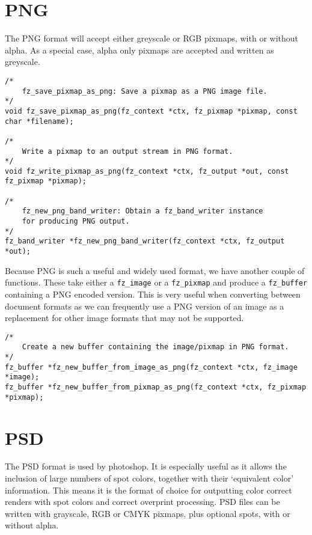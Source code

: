 \documentclass[oneside]{book}
\begin{document}
\section{PNG}

The PNG format will accept either greyscale or RGB pixmaps, with or without alpha. As a special case, alpha only pixmaps are accepted and written as greyscale.

\begin{lstlisting}
/*
	fz_save_pixmap_as_png: Save a pixmap as a PNG image file.
*/
void fz_save_pixmap_as_png(fz_context *ctx, fz_pixmap *pixmap, const char *filename);

/*
	Write a pixmap to an output stream in PNG format.
*/
void fz_write_pixmap_as_png(fz_context *ctx, fz_output *out, const fz_pixmap *pixmap);

/*
	fz_new_png_band_writer: Obtain a fz_band_writer instance
	for producing PNG output.
*/
fz_band_writer *fz_new_png_band_writer(fz_context *ctx, fz_output *out);
\end{lstlisting}

Because PNG is such a useful and widely used format, we have another couple of functions. These take either a \texttt{fz\_image} or a \texttt{fz\_pixmap} and produce a \texttt{fz\_buffer} containing a PNG encoded version. This is very useful when converting between document formats as we can frequently use a PNG version of an image as a replacement for other image formats that may not be supported.

\begin{lstlisting}
/*
	Create a new buffer containing the image/pixmap in PNG format.
*/
fz_buffer *fz_new_buffer_from_image_as_png(fz_context *ctx, fz_image *image);
fz_buffer *fz_new_buffer_from_pixmap_as_png(fz_context *ctx, fz_pixmap *pixmap);
\end{lstlisting}

\section{PSD}

The PSD format is used by photoshop. It is especially useful as it allows the inclusion of large numbers of spot colors, together with their `equivalent color' information. This means it is the format of choice for outputting color correct renders with spot colors and correct overprint processing. PSD files can be written with grayscale, RGB or CMYK pixmaps, plus optional spots, with or without alpha.
\end{document}
